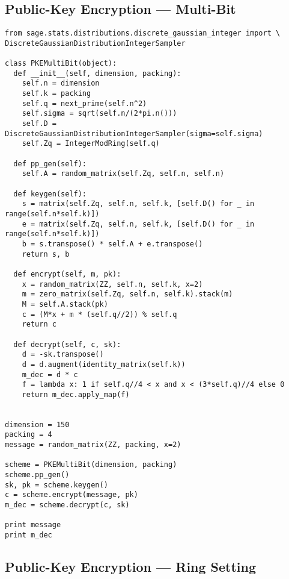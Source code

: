 \documentclass[10pt,a4paper,nobib]{tufte-handout}
\begin{document}
\subsection{Public-Key Encryption --- Multi-Bit}

\lstset{language=sage,label= ,caption= ,captionpos=b,numbers=none}
\begin{lstlisting}
from sage.stats.distributions.discrete_gaussian_integer import \
DiscreteGaussianDistributionIntegerSampler

class PKEMultiBit(object):
  def __init__(self, dimension, packing):
    self.n = dimension
    self.k = packing
    self.q = next_prime(self.n^2)
    self.sigma = sqrt(self.n/(2*pi.n()))
    self.D = DiscreteGaussianDistributionIntegerSampler(sigma=self.sigma)
    self.Zq = IntegerModRing(self.q)

  def pp_gen(self):
    self.A = random_matrix(self.Zq, self.n, self.n)

  def keygen(self):
    s = matrix(self.Zq, self.n, self.k, [self.D() for _ in range(self.n*self.k)])
    e = matrix(self.Zq, self.n, self.k, [self.D() for _ in range(self.n*self.k)])
    b = s.transpose() * self.A + e.transpose()
    return s, b

  def encrypt(self, m, pk):
    x = random_matrix(ZZ, self.n, self.k, x=2)
    m = zero_matrix(self.Zq, self.n, self.k).stack(m)
    M = self.A.stack(pk)
    c = (M*x + m * (self.q//2)) % self.q
    return c

  def decrypt(self, c, sk):
    d = -sk.transpose()
    d = d.augment(identity_matrix(self.k))
    m_dec = d * c
    f = lambda x: 1 if self.q//4 < x and x < (3*self.q)//4 else 0
    return m_dec.apply_map(f)


dimension = 150
packing = 4
message = random_matrix(ZZ, packing, x=2)

scheme = PKEMultiBit(dimension, packing)
scheme.pp_gen()
sk, pk = scheme.keygen()
c = scheme.encrypt(message, pk)
m_dec = scheme.decrypt(c, sk)

print message
print m_dec
\end{lstlisting}

\subsection{Public-Key Encryption --- Ring Setting}
\end{document}
